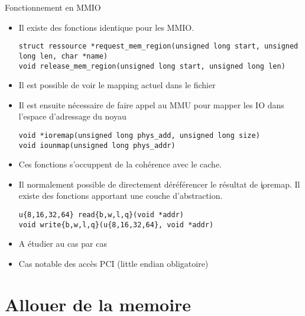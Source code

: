 \begin{frame}[fragile=singleslide]{Fonctionnement en MMIO}
  \begin{itemize} 
  \item Il existe des fonctions identique pour les MMIO.
    \begin{lstlisting} 
struct ressource *request_mem_region(unsigned long start, unsigned long len, char *name)
void release_mem_region(unsigned long start, unsigned long len)
    \end{lstlisting} 
  \item  Il est possible  de voir  le mapping  actuel dans  le fichier
  \item Il  est ensuite nécessaire de  faire appel au  MMU pour mapper
    les IO dans l'espace d'adressage du noyau
    \begin{lstlisting} 
void *ioremap(unsigned long phys_add, unsigned long size)
void iounmap(unsigned long phys_addr)
    \end{lstlisting}  
  \item Ces fonctions s'occuppent de la cohérence avec le cache.
  \item  Il  normalement   possible  de  directement  déréférencer  le
    résultat  de \c{ioremap}.  Il existe  des fonctions  apportant une
    couche d'abstraction.
    \begin{lstlisting}  
u{8,16,32,64} read{b,w,l,q}(void *addr)
void write{b,w,l,q}(u{8,16,32,64}, void *addr)
    \end{lstlisting} 
  \item A étudier au cas par cas 
  \item Cas notable des accès PCI (little endian obligatoire)
  \end{itemize} 
\end{frame} 

\section{Allouer de la memoire}

